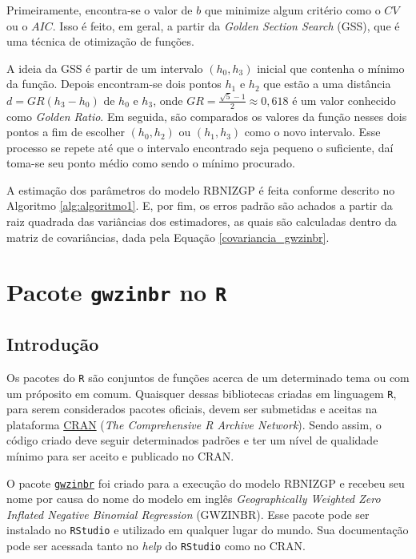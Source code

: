 \documentclass[12pt, a4paper, twoside]{report}
\numberwithin{equation}{section} %
\begin{document}
Primeiramente, encontra-se o valor de $b$ que minimize algum critério como o $CV$ ou o $AIC$. Isso é feito, em geral, a partir da \textit{Golden Section Search} (GSS), que é uma técnica de otimização de funções.

A ideia da GSS é partir de um intervalo $(h_0, h_3)$ inicial que contenha o mínimo da função. Depois encontram-se dois pontos $h_1$ e $h_2$ que estão a uma distância $d=GR(h_3-h_0)$ de $h_0$ e $h_3$, onde $GR=\frac{\sqrt{5}-1}{2} 
\approx 0,618$ é um valor conhecido como \textit{Golden Ratio}. Em seguida, são comparados os valores da função nesses dois pontos a fim de escolher $(h_0,h_2)$ ou $(h_1, h_3)$ como o novo intervalo. Esse processo se repete até que o intervalo encontrado seja pequeno o suficiente, daí toma-se seu ponto médio como sendo o mínimo procurado.

A estimação dos parâmetros do modelo RBNIZGP é feita conforme descrito no Algoritmo \ref{alg:algoritmo1}. E, por fim, os erros padrão são achados a partir da raiz quadrada das variâncias dos estimadores, as quais são calculadas dentro da matriz de covariâncias, dada pela Equação \eqref{covariancia_gwzinbr}.

\chapter{Pacote \texttt{gwzinbr} no \texttt{R}}

\section{Introdução}

Os pacotes do \texttt{R} são conjuntos de funções acerca de um determinado tema ou com um próposito em comum. Quaisquer dessas bibliotecas criadas em linguagem \texttt{R}, para serem considerados pacotes oficiais, devem ser submetidas e aceitas na plataforma \href{https://cran.r-project.org/}{CRAN} (\textit{The Comprehensive R Archive Network}). Sendo assim, o código criado deve seguir determinados padrões e ter um nível de qualidade mínimo para ser aceito e publicado no CRAN.

O pacote \href{https://cran.r-project.org/web/packages/gwzinbr/index.html}{\texttt{gwzinbr}} foi criado para a execução do modelo RBNIZGP e recebeu seu nome por causa do nome do modelo em inglês \textit{Geographically Weighted Zero Inflated Negative Binomial Regression} (GWZINBR). Esse pacote pode ser instalado no \texttt{RStudio} e utilizado em qualquer lugar do mundo. Sua documentação pode ser acessada tanto no \textit{help} do \texttt{RStudio} como no CRAN.
\end{document}
